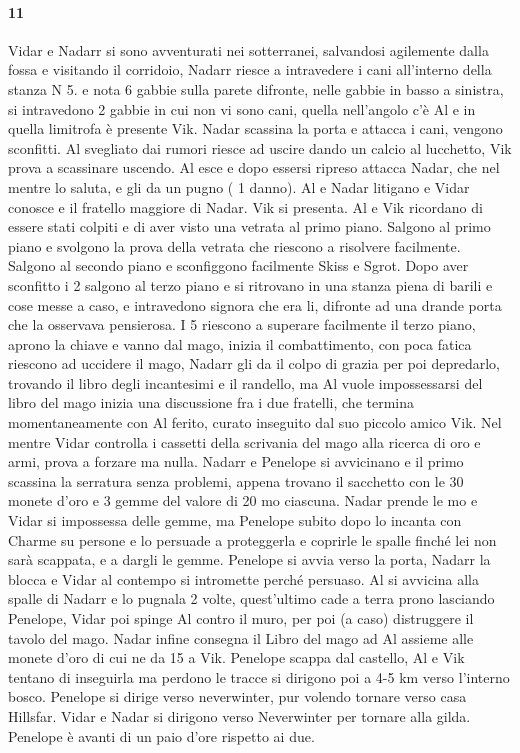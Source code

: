 \documentclass{article}
\begin{document}
                  \paragraph{11}
Vidar e Nadarr si sono avventurati nei sotterranei, salvandosi agilemente dalla fossa e visitando il corridoio, Nadarr riesce a intravedere i cani all'interno della stanza N 5. e nota 6 gabbie sulla parete difronte, nelle gabbie in basso a sinistra, si intravedono 2 gabbie in cui non vi sono cani, quella nell'angolo c'è Al e in quella limitrofa è presente Vik. Nadar scassina la porta e attacca i cani, vengono sconfitti. Al svegliato dai rumori riesce ad uscire dando un calcio al lucchetto, Vik prova a scassinare uscendo. Al esce e dopo essersi ripreso attacca Nadar, che nel mentre lo saluta, e gli da un pugno ( 1 danno). Al e Nadar litigano e Vidar conosce e il fratello maggiore di Nadar. Vik si presenta. Al e Vik ricordano di essere stati colpiti e di aver visto una vetrata al primo piano. Salgono al primo piano e svolgono la prova della vetrata che riescono a risolvere facilmente. Salgono al secondo piano e sconfiggono facilmente Skiss e Sgrot. Dopo aver sconfitto i 2 salgono al terzo piano e si ritrovano in una stanza piena di barili e cose messe a caso, e intravedono signora che era li, difronte ad una drande porta che la osservava pensierosa. I 5 riescono a superare facilmente il terzo piano, aprono la chiave e vanno dal mago, inizia il combattimento, con poca fatica riescono ad uccidere il mago, Nadarr gli da il colpo di grazia per poi depredarlo, trovando il libro degli incantesimi e il randello, ma Al vuole impossessarsi del libro del mago inizia una discussione fra i due fratelli, che termina momentaneamente con Al ferito, curato inseguito dal suo piccolo amico Vik. Nel mentre Vidar controlla i cassetti della scrivania del mago alla ricerca di oro e armi, prova a forzare ma nulla. Nadarr e Penelope si avvicinano e il primo scassina la serratura senza problemi, appena trovano il sacchetto con le 30 monete d'oro e 3 gemme del valore di 20 mo ciascuna. Nadar prende le mo e Vidar si impossessa delle gemme, ma Penelope subito dopo lo incanta con Charme su persone e lo persuade a proteggerla e coprirle le spalle finché lei non sarà scappata, e a dargli le gemme. Penelope si avvia verso la porta, Nadarr la blocca e Vidar al contempo si intromette perché persuaso. Al si avvicina alla spalle di Nadarr e lo pugnala 2 volte, quest'ultimo cade a terra prono lasciando Penelope, Vidar poi spinge Al contro il muro, per poi (a caso) distruggere il tavolo del mago. Nadar infine consegna il Libro del mago ad Al assieme alle monete d'oro di cui ne da 15 a Vik. Penelope scappa dal castello, Al e Vik tentano di inseguirla ma perdono le tracce si dirigono poi a 4-5 km verso l'interno bosco. Penelope si dirige verso neverwinter, pur volendo tornare verso casa Hillsfar. Vidar e Nadar si dirigono verso Neverwinter per tornare alla gilda. Penelope è avanti di un paio d'ore rispetto ai due. 
\end{document}

